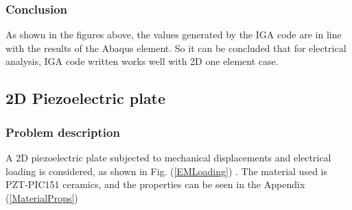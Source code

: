 \documentclass[11pt]{article}
\begin{document}
\subsubsection{Conclusion}
As shown in the figures above, the values generated by the IGA code are in line with the results of the Abaqus element. So it can be concluded that for electrical analysis, IGA code written works well with 2D one element case.



\subsection{2D Piezoelectric plate}
\subsubsection{Problem description}
A 2D piezoelectric plate subjected to mechanical displacements and electrical loading is considered, as shown in Fig. (\ref{EMLoading}) . The material used is PZT-PIC151 ceramics, and the properties can be seen in the Appendix (\ref{MaterialProps})
\end{document}
